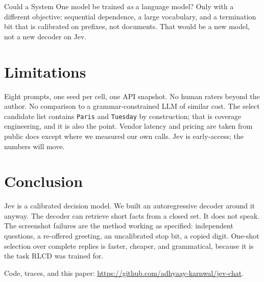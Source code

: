 \documentclass[11pt,twocolumn]{article}
\begin{document}
Could a System One model be trained \emph{as} a language model? Only with a different objective: sequential dependence, a large vocabulary, and a termination bit that is calibrated on prefixes, not documents. That would be a new model, not a new decoder on Jev.

\section{Limitations}

Eight prompts, one seed per cell, one API snapshot. No human raters beyond the author. No comparison to a grammar-constrained LLM of similar cost. The select candidate list contains \texttt{Paris} and \texttt{Tuesday} by construction; that is coverage engineering, and it is also the point. Vendor latency and pricing are taken from public docs except where we measured our own calls. Jev is early-access; the numbers will move.

\section{Conclusion}

Jev is a calibrated decision model. We built an autoregressive decoder around it anyway. The decoder can retrieve short facts from a closed set. It does not speak. The screenshot failures are the method working as specified: independent questions, a re-offered greeting, an uncalibrated stop bit, a copied digit. One-shot selection over complete replies is faster, cheaper, and grammatical, because it is the task RLCD was trained for.

Code, traces, and this paper: \url{https://github.com/adhyaay-karnwal/jev-chat}.



\end{document}
